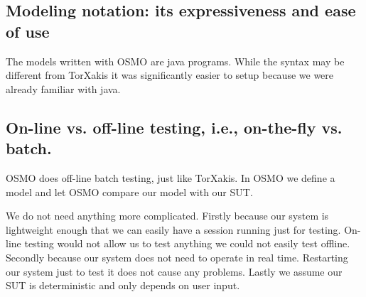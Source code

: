 \documentclass[11pt,a4paper]{article}
\begin{document}
\subsection{Modeling notation: its expressiveness and ease of use}

The models written with OSMO are java programs. While the syntax may
be different from TorXakis it was significantly easier to setup
because we were already familiar with java.

\subsection{On-line vs. off-line testing, i.e., on-the-fly vs. batch.}

OSMO does off-line batch testing, just like TorXakis. In OSMO we
define a model and let OSMO compare our model with our SUT.

We do not need anything more complicated. Firstly because our system
is lightweight enough that we can easily have a session running just
for testing. On-line testing would not allow us to test anything we
could not easily test offline. Secondly because our system does not
need to operate in real time. Restarting our system just to test it
does not cause any problems. Lastly we assume our SUT is deterministic
and only depends on user input.


\end{document}
